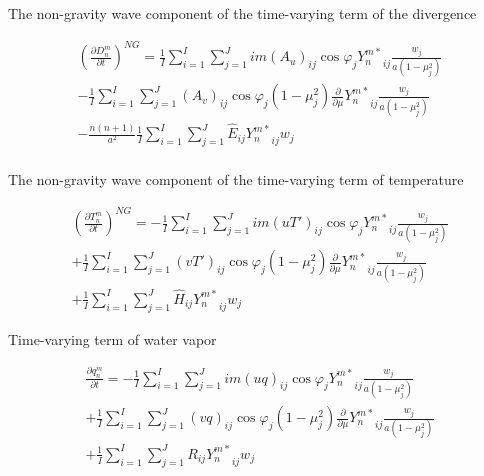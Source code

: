 The non-gravity wave component of the time-varying term of the
divergence

\begin{eqnarray}
  \left( \frac{\partial D_n^m}{\partial t} \right)^{NG}
   =  \frac{1}{I} \sum_{i=1}^{I} \sum_{j=1}^{J}  
          im (A_u)_{ij} \cos \varphi_j
          {Y_n^{m *}}_{ij}
         \frac{w_j}{a(1-\mu_j^{2})}
          \\
   -    \frac{1}{I} \sum_{i=1}^{I} \sum_{j=1}^{J}  
          (A_v)_{ij} \cos \varphi_j
          (1-\mu_j^2)
          \frac{\partial }{\partial \mu} {Y_n^{m *}}_{ij}
          \frac{w_j}{a(1-\mu_j^{2})}
          \\
   -   \frac{n(n+1)}{a^{2}}
         \frac{1}{I} \sum_{i=1}^{I} \sum_{j=1}^{J}  
          \hat{E}_{ij}  {Y_n^{m *}}_{ij} w_j
          \\
\end{eqnarray}

The non-gravity wave component of the time-varying term of temperature

\begin{eqnarray}
  \left( \frac{\partial T_n^m}{\partial t} \right)^{NG}
   =  - \frac{1}{I} \sum_{i=1}^{I} \sum_{j=1}^{J}  
          im (u T')_{ij} \cos \varphi_j
          {Y_n^{m *}}_{ij}
         \frac{w_j}{a(1-\mu_j^{2})}
          \\
     + \frac{1}{I} \sum_{i=1}^{I} \sum_{j=1}^{J}  
          (v T')_{ij} \cos \varphi_j
          (1-\mu_j^2)
          \frac{\partial }{\partial \mu} {Y_n^{m *}}_{ij}
          \frac{w_j}{a(1-\mu_j^{2})}
          \\
     + \frac{1}{I} \sum_{i=1}^{I} \sum_{j=1}^{J}  
          \hat{H}_{ij}
          {Y_n^{m *}}_{ij} w_j
\end{eqnarray}

Time-varying term of water vapor

\begin{eqnarray}
  \frac{\partial q_n^m}{\partial t}
   =  - \frac{1}{I} \sum_{i=1}^{I} \sum_{j=1}^{J}  
          im (uq)_{ij} \cos \varphi_j
          {Y_n^{m *}}_{ij}
         \frac{w_j}{a(1-\mu_j^{2})}
          \\
     + \frac{1}{I} \sum_{i=1}^{I} \sum_{j=1}^{J}  
          (vq)_{ij} \cos \varphi_j
          (1-\mu_j^2)
          \frac{\partial }{\partial \mu} {Y_n^{m *}}_{ij}
          \frac{w_j}{a(1-\mu_j^{2})}
          \\
     + \frac{1}{I} \sum_{i=1}^{I} \sum_{j=1}^{J}  
          R_{ij}
          {Y_n^{m *}}_{ij} w_j
\end{eqnarray}


